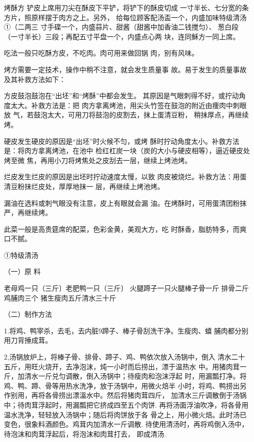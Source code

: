 \begin{recipe}{烤酥方}
\step 铲皮上席用刀尖在酥皮下平铲，将铲下的酥皮切成
一寸半长、七分宽的条方片，照原样摆于肉方之上。另外，
给每位顾客配汤盃一个，内盛加味特级清汤①（二两三
寸手碟一个，内盛蒜片、甜酱（甜酱中加香油二钱搅匀）、
葱白段（一寸半长）三段；再配五寸平盘一个，内盛点心两 块，连同穌方一同上席。

\step 吃法一般只吃酥方皮，不吃肉。肉可用来做回锅 肉，别有风味。

\notice

烤方需要一定技术，操作中稍不注意，就会发生质量事
故。易于发生的质量事故及其补救方法如下：

\step 方皮鼓泡鼓泡在“出坯”和“烤酥”中都会发生。
其原因是气眼刺得不好，或拧动角度太大。补救方法是：把
肉方拿离烤池，用尖头竹签在鼓泡的附近由痩肉中刺眼放
气，若鼓泡太大，可用刀将鼓泡的皮割去，抹上蛋清豆粉， 稍抹厚点，再继续烤。

\step 硬皮发生硬皮的原因是“出坯”时火候不匀，或烤
酥时拧动角度太小。补救方法是：将肉方拿离烤池，在池中
检红杠炭一块（炭的大小与硬皮相等），逼近硬皮处烤至微
焦，再用小刀将烤焦处之皮刮去一层，继续上烤池烤。

\step 烂皮发生烂皮的原因是出坯时拧动速度太慢，以致
肉皮被烧烂。补救方法：用蛋清豆粉抹烂皮处，厚厚地抹一 层，再继续上烤池烤。

\step 漏油在选料或刺气眼没有注意，皮上有眼就会漏
油。在烤酥时，可用蛋清团粉抹严，再继续烤。

\notes

此菜一般是高贵筵席的配菜，色彩金黄，美观大方，吃
时酥香，脂肪特多，而爽口不腻。

①特级清汤

（一）原 料

老母鸡一只（三斤〕老肥鸭一只（三斤〕
火腿蹄子一只火腿棒子骨一斤
排骨二斤鸡脯肉三个
猪生瘦肉五斤清水三十斤

（二）制作方法

1.将鸡、鸭宰杀，去毛，去内脏9蹄子、棒子骨刮洗干净。生瘦肉、蟢 脯肉都分别用刀背捶成茸。

2,汤锅放炉上，将棒子骨、排骨、蹄子、鸡、鸭依次放入汤锅中，倒入 清水二十五斤，用旺火烧开，去净泡沫，炖一小时而后捞出，漂于温热水 中。用猪肉茸一斤，加清水一斤兑匀调散，倒入汤锅中；待瘦肉和泡沫浮起 时，用漏瓢打净。将鸡、鸭、蹄、骨等用热水洗净，放于汤锅中，用微火焙半 小时，将鸡、鸭捞出另作别用，再将各骨捞出漂溫水中。然后将猪肉茸四斤， 加清水三斤调散倒于汤锅中；待肉茸浮起时，用漏瓢把它挤成四至五个肉饼. 再将汤面浮油吹净，将各骨用温水洗净，轻轻放入汤锅中；随后将肉饼放于各 骨之上，用小微火焙。此时汤已变色，很象料酒颜色。鸡茸内加清水一斤调散. 待使用清汤时，再将鸡倒入汤中，待泡沫和肉茸浮起后，将泡沫和肉茸打去， 即成清汤.

\end{recipe}

